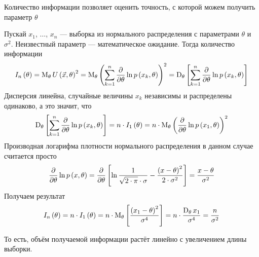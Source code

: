 Количество информации позволяет оценить точность,
с которой можем получить параметр $\theta$

\begin{example}
  Пускай $x_1$, $\dots$, $x_n$ --- выборка из нормального распределения с
  параметрами $\theta$ и $\sigma^2$.
  Неизвестный параметр --- математическое ожидание.
  Тогда количество информации
  \begin{equation*}
    I_n\left( \theta \right)
    = \operatorname{M}_{\theta} U\left( \vec{x}, \theta \right)^2
    = \operatorname{M}_{\theta} \left( \sum_{k=1}^{n} \frac{\partial}{\partial\theta}
      \ln{p\left(x_k, \theta\right)} \right)^2
    = \operatorname{D}_{\theta} \left[ \sum_{k=1}^{n} \frac{\partial}{\partial\theta}
      \ln{p\left(x_k, \theta\right)} \right]
  \end{equation*}
  Дисперсия линейна, случайные величины $x_k$ независимы и распределены
  одинаково, а это значит, что
  \begin{equation*}
    \operatorname{D}_{\theta} \left[ \sum_{k=1}^{n} \frac{\partial}{\partial\theta}
      \ln{p\left(x_k, \theta\right)} \right]
    = n \cdot I_1\left( \theta \right)
    = n \cdot \operatorname{M}_{\theta} \left( \frac{\partial}{\partial \theta}
      \ln{p\left(x_1, \theta\right)} \right)^2
  \end{equation*}
  Производная логарифма плотности нормального распределения в данном случае
  считается просто
  \begin{equation*}
    \frac{\partial}{\partial \theta} \ln{p\left(x, \theta\right)}
    = \frac{\partial}{\partial \theta} \left[
        \ln{\frac{1}{\sqrt{2 \cdot \pi} \cdot \sigma}}
        - \frac{\left( x - \theta \right)^2}{2 \cdot \sigma^2} \right]
    = \frac{x - \theta}{\sigma^2}
  \end{equation*}
  Получаем результат
  \begin{equation*}
    I_n\left( \theta \right) = n \cdot I_1\left( \theta \right)
    = n \cdot \operatorname{M}_{\theta} \left[ \frac{\left( x_1 - \theta \right)^2}{\sigma^4} \right]
    = n \cdot \frac{\operatorname{D}_{\theta} x_1}{\sigma^4}
    = \frac{n}{\sigma^2}
  \end{equation*}

  То есть, объём получаемой информации растёт линейно с увеличением длины
  выборки.
\end{example}

